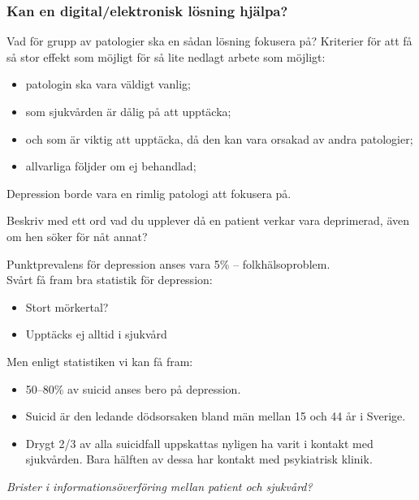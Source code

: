 \documentclass[english]{beamer}
\begin{document}
\begin{frame}
\frametitle{Kan en digital/elektronisk lösning hjälpa?}
	Vad för grupp av patologier ska en sådan lösning fokusera på?
	Kriterier för att få så stor effekt som möjligt för så lite nedlagt arbete som möjligt:
	\begin{itemize}
	\item patologin ska vara väldigt vanlig;
	\item som sjukvården är dålig på att upptäcka;
	\item och som är viktig att upptäcka, då den kan vara orsakad av andra patologier;
	\item allvarliga följder om ej behandlad;
	\end{itemize}
	\pause
	Depression borde vara en rimlig patologi att fokusera på.
\end{frame}

\begin{frame}
\textcolor{lila}{Beskriv med ett ord vad du upplever då en patient verkar vara deprimerad, även om hen söker för nåt annat?}
\end{frame}

\begin{frame}
	Punktprevalens för depression anses vara 5\% -- folkhälsoproblem.\\
	Svårt få fram bra statistik för depression: %
	\begin{itemize}
	\item Stort mörkertal?
	\item Upptäcks ej alltid i sjukvård
	\end{itemize}
	Men enligt statistiken vi kan få fram:
	\begin{itemize}
	\item 50--80\% av suicid anses bero på depression.
	\item Suicid är den ledande dödsorsaken bland män mellan 15 och 44 år i Sverige.
	\item Drygt 2/3 av alla suicidfall uppskattas nyligen ha varit i kontakt med sjukvården. Bara hälften av dessa har kontakt med psykiatrisk klinik.
	\end{itemize}
	\pause
	{\textit{Brister i informationsöverföring mellan patient och sjukvård?}}

\end{frame}
\end{document}
